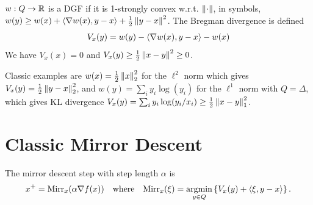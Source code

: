     \begin{definition}
        $w: Q \to \mathbb{R}$ is a DGF if it is 1-strongly convex w.r.t. $\left\lVert \cdot \right\rVert$, in symbols, $w(y) \geq w(x) + \langle \nabla w(x), y-x \rangle + \frac 12 \left\lVert y-x \right\rVert^2$. The Bregman divergence is defined
        \begin{align*}
            V_x(y) = w(y) - \langle \nabla w(x), y-x \rangle - w(x) 
        \end{align*}
        We have $V_x(x) = 0$ and $V_x(y) \geq \frac 12 \left\lVert x-y \right\rVert^2 \geq 0$. 
    \end{definition}
    Classic examples are $w(x) = \frac 12 \left\lVert x \right\rVert_2^2$ for the $\ell^2$ norm which gives $V_x(y) = \frac 12 \left\lVert y-x \right\rVert_2^2$, and $w(y) = \sum_i y_i \log(y_i)$ for the $\ell^1$ norm with $Q = \Delta$, which gives KL divergence $V_x(y) = \sum_i y_i \log(y_i/x_i) \geq \frac 12 \left\lVert x-y \right\rVert^2_1$. 

    \section{Classic Mirror Descent}
    \begin{definition}
        The mirror descent step with step length $\alpha$ is 
        \begin{align*}
            x^+ = \mathrm{Mirr}_x(\alpha \nabla f(x)) \quad \text{where} \quad \mathrm{Mirr}_x(\xi) = \underset{y \in Q}{\mathrm{argmin}} \left\{V_x(y) + \langle \xi, y-x \rangle \right\}.
        \end{align*}
    \end{definition}

